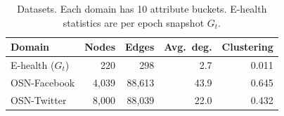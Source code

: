 \begin{table}[htbp]
\centering
\caption{Datasets. Each domain has 10 attribute buckets. E-health statistics are per epoch snapshot $G_t$.}
\label{tab:datasets}
\small
\begin{tabular}{lrrrr}
\toprule
Domain & Nodes & Edges & Avg.\ deg. & Clustering\\
\midrule
E-health ($G_t$) & 220 & 298 & 2.7 & 0.011\\
OSN-Facebook & 4{,}039 & 88{,}613 & 43.9 & 0.645\\
OSN-Twitter & 8{,}000 & 88{,}039 & 22.0 & 0.432\\
\bottomrule
\end{tabular}
\end{table}
